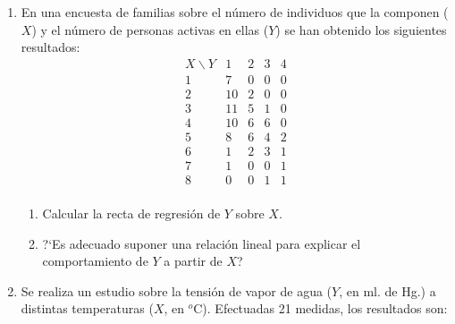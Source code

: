 \documentclass[11pt]{book}
\begin{document}
\begin{enumerate}
  \begin{enumerate}
     \item  Calcular el peso medio y la altura media y decir cu\'al es m\'as representativo.
     \item Calcular el porcentaje de individuos que pesan menos de 55 Kg y miden m\'as de 165 cm.
     \item Entre  los que miden m\'as de165 cm, ?`cu\'al es el porcentaje de los que pesan m\'as de 52 Kg?
     \item ?`Cu\'al es la altura m\'as frecuente entre los individuos cuyo peso oscila entre 51 y 57 Kg?
     \item ?`Qu\'e peso medio es m\'as representativo, el de los individuos que miden 164 cm o el de los que miden 168 cm?
  \end{enumerate}


\item En una encuesta de  familias sobre el n{\'u}mero  de  individuos
que  la componen ($X$) y el n{\'u}mero de personas activas en ellas
($Y$)  se  han obtenido los siguientes resultados:
$$
    \begin{array}{c|cccc}
          X \backslash Y &   1 &  2 &  3  & 4 \\ \hline
           1    &   7 &  0 &  0  & 0  \\
           2    &  10 &  2 &  0  & 0  \\
           3    &  11 &  5 &  1  & 0  \\
           4    &  10 &  6 &  6  & 0  \\
           5    &   8 &  6 &  4  & 2  \\
           6    &   1 &  2 &  3  & 1  \\
           7    &   1 &  0 &  0  & 1  \\
           8    &   0 &  0 &  1  & 1  \\
     \end{array}
$$

  \begin{enumerate}

     \item Calcular la recta de regresi\'on de $Y$ sobre $X$.
  \item
   ?`Es adecuado suponer una relaci\'on lineal para explicar el comportamiento de $Y$ a partir de $X$?
  \end{enumerate}


\item Se realiza un estudio sobre la tensi{\'o}n de vapor de agua
 ($Y$, en ml. de Hg.) a distintas temperaturas ($X$, en ${}^o$C). Efectuadas 21
medidas, los resultados son:


\end{enumerate}
\end{document}
